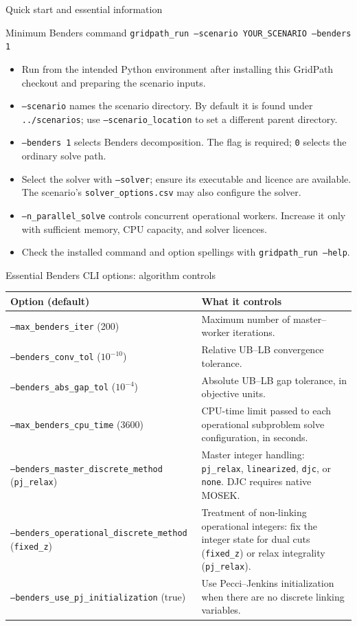 \documentclass[aspectratio=169,10pt]{beamer}
\begin{document}
\begin{frame}{Quick start and essential information}
\small
\begin{block}{Minimum Benders command}
\texttt{gridpath\_run --scenario YOUR\_SCENARIO --benders 1}
\end{block}
\begin{itemize}
\item Run from the intended Python environment after installing this GridPath checkout and preparing the scenario inputs.
\item \texttt{--scenario} names the scenario directory. By default it is found under \texttt{../scenarios}; use \texttt{--scenario\_location} to set a different parent directory.
\item \texttt{--benders 1} selects Benders decomposition. The flag is required; \texttt{0} selects the ordinary solve path.
\item Select the solver with \texttt{--solver}; ensure its executable and licence are available. The scenario's \texttt{solver\_options.csv} may also configure the solver.
\item \texttt{--n\_parallel\_solve} controls concurrent operational workers. Increase it only with sufficient memory, CPU capacity, and solver licences.
\item Check the installed command and option spellings with \texttt{gridpath\_run --help}.
\end{itemize}
\end{frame}

\begin{frame}{Essential Benders CLI options: algorithm controls}
\scriptsize
\begin{tabular}{@{}p{}p{}@{}}
\toprule Option (default) & What it controls \\
\midrule
\texttt{--max\_benders\_iter} (200) & Maximum number of master--worker iterations. \\
\texttt{--benders\_conv\_tol} ($10^{-10}$) & Relative UB--LB convergence tolerance. \\
\texttt{--benders\_abs\_gap\_tol} ($10^{-4}$) & Absolute UB--LB gap tolerance, in objective units. \\
\texttt{--max\_benders\_cpu\_time} (3600) & CPU-time limit passed to each operational subproblem solve configuration, in seconds. \\
\texttt{--benders\_master\_discrete\_method} (\texttt{pj\_relax}) & Master integer handling: \texttt{pj\_relax}, \texttt{linearized}, \texttt{djc}, or \texttt{none}. DJC requires native MOSEK. \\
\texttt{--benders\_operational\_discrete\_method} (\texttt{fixed\_z}) & Treatment of non-linking operational integers: fix the integer state for dual cuts (\texttt{fixed\_z}) or relax integrality (\texttt{pj\_relax}). \\
\texttt{--benders\_use\_pj\_initialization} (true) & Use Pecci--Jenkins initialization when there are no discrete linking variables. \\
\bottomrule
\end{tabular}
\end{frame}
\end{document}

